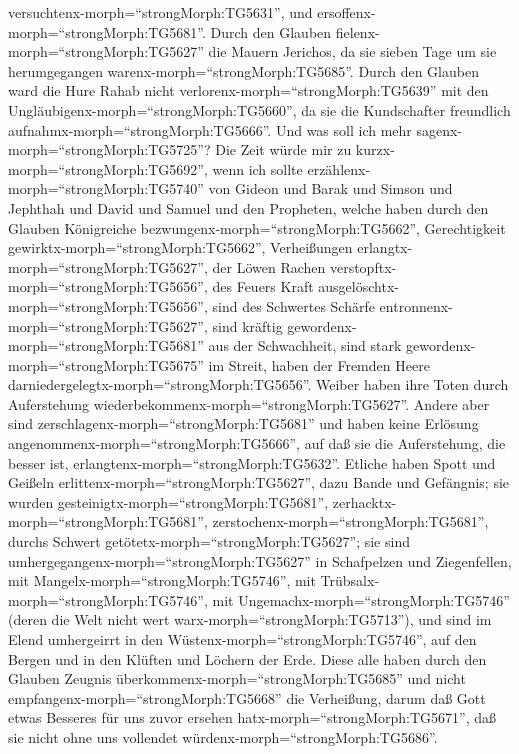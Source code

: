 versuchtenx-morph=``strongMorph:TG5631'', und
ersoffenx-morph=``strongMorph:TG5681''.  Durch den Glauben
fielenx-morph=``strongMorph:TG5627'' die Mauern Jerichos, da sie sieben
Tage um sie herumgegangen warenx-morph=``strongMorph:TG5685''.
 Durch den Glauben ward die Hure Rahab nicht
verlorenx-morph=``strongMorph:TG5639'' mit den
Ungläubigenx-morph=``strongMorph:TG5660'', da sie die Kundschafter
freundlich aufnahmx-morph=``strongMorph:TG5666''.  Und was
soll ich mehr sagenx-morph=``strongMorph:TG5725''? Die Zeit würde mir zu
kurzx-morph=``strongMorph:TG5692'', wenn ich sollte
erzählenx-morph=``strongMorph:TG5740'' von Gideon und Barak und Simson
und Jephthah und David und Samuel und den Propheten, 
welche haben durch den Glauben Königreiche
bezwungenx-morph=``strongMorph:TG5662'', Gerechtigkeit
gewirktx-morph=``strongMorph:TG5662'', Verheißungen
erlangtx-morph=``strongMorph:TG5627'', der Löwen Rachen
verstopftx-morph=``strongMorph:TG5656'',  des Feuers Kraft
ausgelöschtx-morph=``strongMorph:TG5656'', sind des Schwertes Schärfe
entronnenx-morph=``strongMorph:TG5627'', sind kräftig
gewordenx-morph=``strongMorph:TG5681'' aus der Schwachheit, sind stark
gewordenx-morph=``strongMorph:TG5675'' im Streit, haben der Fremden
Heere darniedergelegtx-morph=``strongMorph:TG5656''. 
Weiber haben ihre Toten durch Auferstehung
wiederbekommenx-morph=``strongMorph:TG5627''. Andere aber sind
zerschlagenx-morph=``strongMorph:TG5681'' und haben keine Erlösung
angenommenx-morph=``strongMorph:TG5666'', auf daß sie die Auferstehung,
die besser ist, erlangtenx-morph=``strongMorph:TG5632''. 
Etliche haben Spott und Geißeln erlittenx-morph=``strongMorph:TG5627'',
dazu Bande und Gefängnis;  sie wurden
gesteinigtx-morph=``strongMorph:TG5681'',
zerhacktx-morph=``strongMorph:TG5681'',
zerstochenx-morph=``strongMorph:TG5681'', durchs Schwert
getötetx-morph=``strongMorph:TG5627''; sie sind
umhergegangenx-morph=``strongMorph:TG5627'' in Schafpelzen und
Ziegenfellen, mit Mangelx-morph=``strongMorph:TG5746'', mit
Trübsalx-morph=``strongMorph:TG5746'', mit
Ungemachx-morph=``strongMorph:TG5746''  (deren die Welt
nicht wert warx-morph=``strongMorph:TG5713''), und sind im Elend
umhergeirrt in den Wüstenx-morph=``strongMorph:TG5746'', auf den Bergen
und in den Klüften und Löchern der Erde.  Diese alle haben
durch den Glauben Zeugnis überkommenx-morph=``strongMorph:TG5685'' und
nicht empfangenx-morph=``strongMorph:TG5668'' die Verheißung,
 darum daß Gott etwas Besseres für uns zuvor ersehen
hatx-morph=``strongMorph:TG5671'', daß sie nicht ohne uns vollendet
würdenx-morph=``strongMorph:TG5686''.

